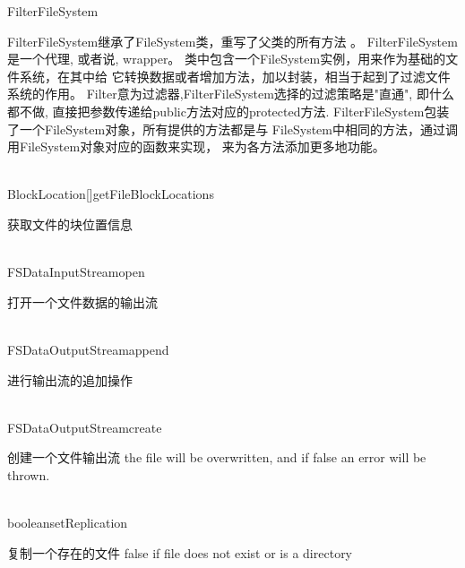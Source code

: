 \begin{XeClass}{FilterFileSystem}
   
 FilterFileSystem继承了FileSystem类，重写了父类的所有方法 。
 FilterFileSystem是一个代理, 或者说, wrapper。
 类中包含一个FileSystem实例，用来作为基础的文件系统，在其中给
 它转换数据或者增加方法，加以封装，相当于起到了过滤文件系统的作用。
 Filter意为过滤器,FilterFileSystem选择的过滤策略是"直通",
 即什么都不做, 直接把参数传递给public方法对应的protected方法.
 FilterFileSystem包装了一个FileSystem对象，所有提供的方法都是与
 FileSystem中相同的方法，通过调用FileSystem对象对应的函数来实现，
 来为各方法添加更多地功能。

  \begin{XeMethod}{\XePublic\\ }{BlockLocation[]}{getFileBlockLocations}
       
 获取文件的块位置信息

  \end{XeMethod}

  \begin{XeMethod}{\XePublic\\ }{FSDataInputStream}{open}
       
 打开一个文件数据的输出流

  \end{XeMethod}

  \begin{XeMethod}{\XePublic\\ }{FSDataOutputStream}{append}
       
 进行输出流的追加操作

  \end{XeMethod}

  \begin{XeMethod}{\XePublic\\ }{FSDataOutputStream}{create}
       
 创建一个文件输出流
 the file will be overwritten, and if false an error will be thrown.

  \end{XeMethod}

  \begin{XeMethod}{\XePublic\\ }{boolean}{setReplication}
       
 复制一个存在的文件
 false if file does not exist or is a directory

  \end{XeMethod}


\end{XeClass}
